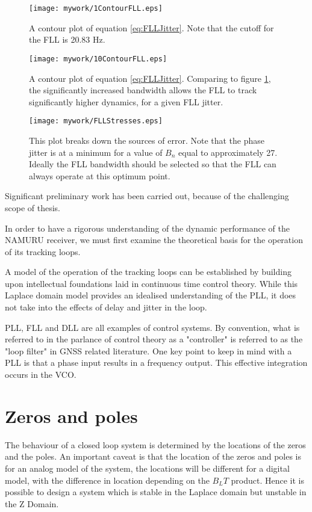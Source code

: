 \begin{figure}[!htb] 
    \centering
    \texttt{[image: mywork/1ContourFLL.eps]} 
    \caption{A contour plot of equation \ref{eq:FLLJitter}. Note that the cutoff for the FLL is 20.83 Hz. }
\label{fig:FLLContour1}
\end{figure}

\begin{figure}[!htb] 
    \centering
    \texttt{[image: mywork/10ContourFLL.eps]} 
    \caption{A contour plot of equation \ref{eq:FLLJitter}. Comparing to figure \ref{fig:FLLContour1}, the significantly increased bandwidth allows the FLL to track significantly higher dynamics, for a given FLL jitter.}
\end{figure}



\begin{figure}[!htb] 
    \centering
    \texttt{[image: mywork/FLLStresses.eps]} 
    \caption{This plot breaks down the sources of error. Note that the phase jitter is at a minimum for a value of $B_n$ equal to approximately 27. Ideally the FLL bandwidth should be selected so that the FLL can always operate at this optimum point.}
\end{figure}



Significant preliminary work has been carried out, because of the challenging scope of thesis. 

In order to have a rigorous understanding of the dynamic performance of the \ac{NAMURU} receiver, we must first examine the theoretical basis for the operation of its tracking loops. 

A model of the operation of the tracking loops can be established by building upon intellectual foundations laid in continuous time control theory. While this Laplace domain model provides an idealised understanding of the \ac{PLL}, it does not take into the effects of delay and jitter in the loop. 

\ac{PLL}, \ac{FLL} and \ac{DLL} are all examples of control systems. By convention, what is referred to in the parlance of control theory as a "controller" is referred to as the "loop filter" in \ac{GNSS} related literature. One key point to keep in mind with a \ac{PLL} is that a phase input results in a frequency output. This effective integration occurs in the \ac{VCO}.

\section{Zeros and poles}
The behaviour of a closed loop system is determined by the locations of the zeros and the poles. An important caveat is that the location of the zeros and poles is for an analog model of the system, the locations will be different for a digital model, with the difference in location depending on the $B_LT$ product.  Hence it is possible to design a system which is stable in the Laplace domain but unstable in the Z Domain. 

